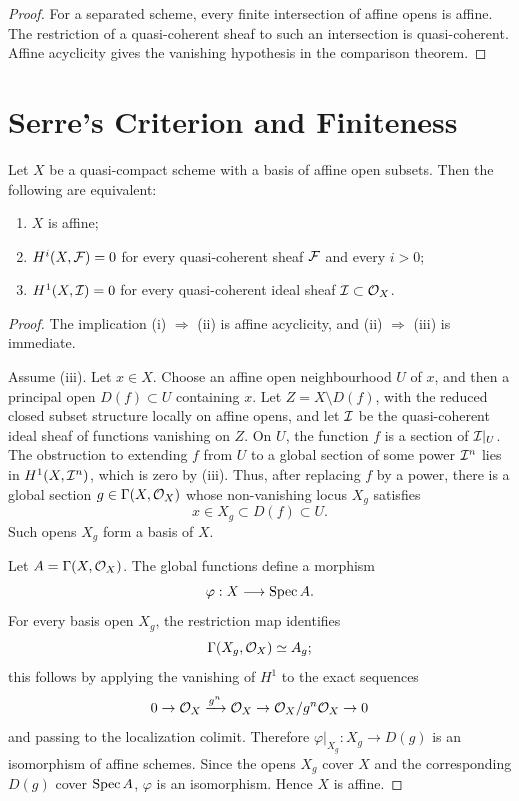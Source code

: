 \begin{proof}
For a separated scheme, every finite intersection of affine opens is affine.
The restriction of a quasi-coherent sheaf to such an intersection is
quasi-coherent.  Affine acyclicity gives the vanishing hypothesis in the
comparison theorem.
\end{proof}

\section{Serre's Criterion and Finiteness}

\begin{theorem}
Let \(X\) be a quasi-compact scheme with a basis of affine open subsets.  Then
the following are equivalent:
\begin{enumerate}[label=(\roman*)]
    \item \(X\) is affine;
    \item \(H^i(X,\mathcal{F})=0\) for every quasi-coherent sheaf \(\mathcal{F}\) and every
    \(i>0\);
    \item \(H^1(X,\mathcal{I})=0\) for every quasi-coherent ideal sheaf
    \(\mathcal{I}\subset\mathcal{O}_X\).
\end{enumerate}
\end{theorem}

\begin{proof}
The implication (i) \(\Rightarrow\) (ii) is affine acyclicity, and
(ii) \(\Rightarrow\) (iii) is immediate.

Assume (iii).  Let \(x\in X\).  Choose an affine open neighbourhood \(U\) of
\(x\), and then a principal open \(D(f)\subset U\) containing \(x\).  Let
\(Z=X\setminus D(f)\), with the reduced closed subset structure locally on
affine opens, and let \(\mathcal{I}\) be the quasi-coherent ideal sheaf of functions
vanishing on \(Z\).  On \(U\), the function \(f\) is a section of \(\mathcal{I}|_U\).
The obstruction to extending \(f\) from \(U\) to a global section of some power
\(\mathcal{I}^n\) lies in \(H^1(X,\mathcal{I}^n)\), which is zero by (iii).  Thus, after
replacing \(f\) by a power, there is a global section \(g\in\Gamma(X,\mathcal{O}_X)\)
whose non-vanishing locus \(X_g\) satisfies
\[
    x\in X_g\subset D(f)\subset U.
\]
Such opens \(X_g\) form a basis of \(X\).

Let \(A=\Gamma(X,\mathcal{O}_X)\).  The global functions define a morphism
\[
    \varphi:X\longrightarrow \operatorname{Spec} A.
\]
For every basis open \(X_g\), the restriction map identifies
\[
    \Gamma(X_g,\mathcal{O}_X)\simeq A_g;
\]
this follows by applying the vanishing of \(H^1\) to the exact sequences
\[
    0\to\mathcal{O}_X \xrightarrow{g^n} \mathcal{O}_X\to \mathcal{O}_X/g^n\mathcal{O}_X\to0
\]
and passing to the localization colimit.  Therefore
\(\varphi|_{X_g}:X_g\to D(g)\) is an isomorphism of affine schemes.  Since the
opens \(X_g\) cover \(X\) and the corresponding \(D(g)\) cover \(\operatorname{Spec} A\),
\(\varphi\) is an isomorphism.  Hence \(X\) is affine.
\end{proof}

